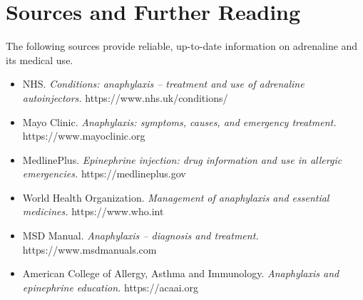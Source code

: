 \section*{Sources and Further Reading}
The following sources provide reliable, up-to-date information on adrenaline and its medical use.

\begin{itemize}
    \item NHS. \textit{Conditions: anaphylaxis -- treatment and use of adrenaline autoinjectors.} https://www.nhs.uk/conditions/
    \item Mayo Clinic. \textit{Anaphylaxis: symptoms, causes, and emergency treatment.} https://www.mayoclinic.org
    \item MedlinePlus. \textit{Epinephrine injection: drug information and use in allergic emergencies.} https://medlineplus.gov
    \item World Health Organization. \textit{Management of anaphylaxis and essential medicines.} https://www.who.int
    \item MSD Manual. \textit{Anaphylaxis -- diagnosis and treatment.} https://www.msdmanuals.com
    \item American College of Allergy, Asthma and Immunology. \textit{Anaphylaxis and epinephrine education.} https://acaai.org
\end{itemize}
